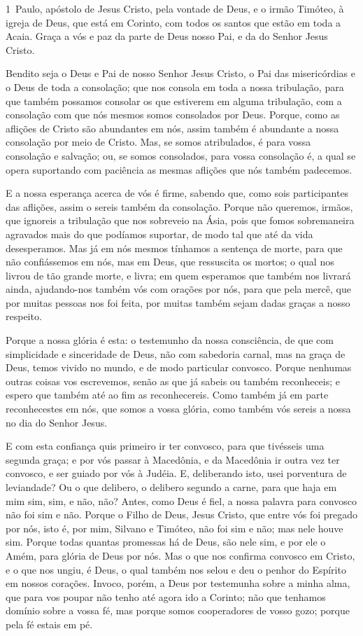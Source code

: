 
\lettrine{1}\ Paulo, apóstolo de Jesus Cristo, pela vontade de
Deus, e o irmão Timóteo, à igreja de Deus, que está em Corinto, com
todos os santos que estão em toda a Acaia. Graça a vós e paz da
parte de Deus nosso Pai, e da do Senhor Jesus Cristo.

Bendito seja o Deus e Pai de nosso Senhor Jesus Cristo, o Pai das
misericórdias e o Deus de toda a consolação; que nos consola em
toda a nossa tribulação, para que também possamos consolar os que
estiverem em alguma tribulação, com a consolação com que nós mesmos
somos consolados por Deus. Porque, como as aflições de Cristo
são abundantes em nós, assim também é abundante a nossa consolação
por meio de Cristo. Mas, se somos atribulados, é para vossa
consolação e salvação; ou, se somos consolados, para vossa
consolação é, a qual se opera suportando com paciência as mesmas
aflições que nós também padecemos.

E a nossa esperança acerca de vós é firme, sabendo que, como sois
participantes das aflições, assim o sereis também da consolação.
Porque não queremos, irmãos, que ignoreis a tribulação que nos
sobreveio na Ásia, pois que fomos sobremaneira agravados mais do que
podíamos suportar, de modo tal que até da vida desesperamos. Mas
já em nós mesmos tínhamos a sentença de morte, para que não
confiássemos em nós, mas em Deus, que ressuscita os mortos; o
qual nos livrou de tão grande morte, e livra; em quem esperamos que
também nos livrará ainda, ajudando-nos também vós com orações
por nós, para que pela mercê, que por muitas pessoas nos foi feita,
por muitas também sejam dadas graças a nosso respeito.

Porque a nossa glória é esta: o testemunho da nossa consciência,
de que com simplicidade e sinceridade de Deus, não com sabedoria
carnal, mas na graça de Deus, temos vivido no mundo, e de modo
particular convosco. Porque nenhumas outras coisas vos
escrevemos, senão as que já sabeis ou também reconheceis; e espero
que também até ao fim as reconhecereis. Como também já em
parte reconhecestes em nós, que somos a vossa glória, como também
vós sereis a nossa no dia do Senhor Jesus.

E com esta confiança quis primeiro ir ter convosco, para que
tivésseis uma segunda graça; e por vós passar à Macedônia, e
da Macedônia ir outra vez ter convosco, e ser guiado por vós à
Judéia. E, deliberando isto, usei porventura de leviandade?
Ou o que delibero, o delibero segundo a carne, para que haja em mim
sim, sim, e não, não? Antes, como Deus é fiel, a nossa
palavra para convosco não foi sim e não. Porque o Filho de
Deus, Jesus Cristo, que entre vós foi pregado por nós, isto é, por
mim, Silvano e Timóteo, não foi sim e não; mas nele houve sim.
Porque todas quantas promessas há de Deus, são nele sim, e
por ele o Amém, para glória de Deus por nós. Mas o que nos
confirma convosco em Cristo, e o que nos ungiu, é Deus, o
qual também nos selou e deu o penhor do Espírito em nossos corações.
Invoco, porém, a Deus por testemunha sobre a minha alma, que
para vos poupar não tenho até agora ido a Corinto; não que
tenhamos domínio sobre a vossa fé, mas porque somos cooperadores de
vosso gozo; porque pela fé estais em pé.


